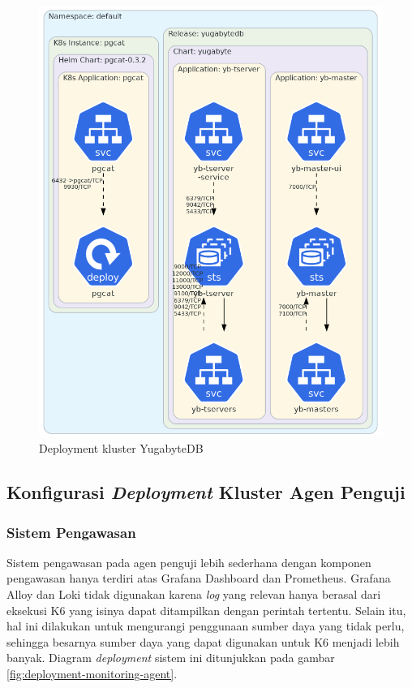 \begin{figure}[htbp]
    \centering
    \includegraphics[width=1\textwidth]{resources/chapter-4/yugabyte.png}
    \caption{Deployment kluster YugabyteDB}
    \label{fig:deployment-yugabyte}
\end{figure}

\pagebreak

\subsection{Konfigurasi \textit{Deployment} Kluster Agen Penguji}

\subsubsection{Sistem Pengawasan}

Sistem pengawasan pada agen penguji lebih sederhana dengan komponen pengawasan hanya terdiri atas Grafana Dashboard dan Prometheus. Grafana Alloy dan Loki tidak digunakan karena \textit{log} yang relevan hanya berasal dari eksekusi K6 yang isinya dapat ditampilkan dengan perintah tertentu. Selain itu, hal ini dilakukan untuk mengurangi penggunaan sumber daya yang tidak perlu, sehingga besarnya sumber daya yang dapat digunakan untuk K6 menjadi lebih banyak. Diagram \textit{deployment} sistem ini ditunjukkan pada gambar \ref{fig:deployment-monitoring-agent}.


